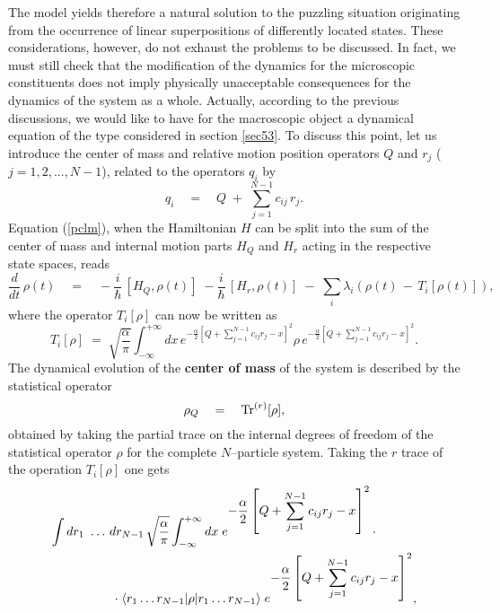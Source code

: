 \documentclass[12pt]{article}
\begin{document}
The model yields therefore a natural solution to the puzzling
situation originating from the occurrence of linear superpositions
of differently located states. These considerations, however, do
not exhaust the problems to be discussed. In fact, we must still
check that the modification of the dynamics for the microscopic
constituents does not imply physically unacceptable consequences
for the dynamics of the system as a whole. Actually, according to
the previous discussions, we would like to have for the
macroscopic object a dynamical equation of the type considered in
section \ref{sec53}. To discuss this point, let us introduce the
center  of mass and relative motion position operators $Q$ and
$r_{j}$ ($j=1,2,...,N-1$), related to the operators $q_{i}$ by
\begin{equation}
q_{i} \quad = \quad  Q \; + \; \sum_{j=1}^{N-1} c_{ij}\, r_{j}.
\end{equation}
Equation (\ref{pclm}), when the Hamiltonian $H$ can be split into
the sum of the center   of mass and internal motion parts $H_{Q}$
and $H_{r}$ acting in the respective state spaces, reads
\begin{equation} \label{pclm2}
\frac{d}{dt}\, \rho(t) \quad = \quad -\frac{i}{\hbar}\, [H_{Q},
\rho(t)] \; -\frac{i}{\hbar}\, [H_{r}, \rho(t)] \; - \; \sum_{i}
\lambda_{i} \left( \rho(t) \, - \, T_{i}[\rho(t)]\right),
\end{equation}
where the operator $T_{i}[\rho]$ can now be written as
\begin{equation}
T_{i}[\rho] \; = \; \sqrt{\frac{\alpha}{\pi}}
\int_{-\infty}^{+\infty} dx\, e^{\displaystyle -\frac{\alpha}{2}
\left[Q + \sum_{j=1}^{N-1} c_{ij} r_{j} - x \right]^{2}} \rho\,
 e^{\displaystyle -\frac{\alpha}{2}
\left[Q + \sum_{j=1}^{N-1} c_{ij} r_{j} - x \right]^{2}}.
\end{equation}
The dynamical evolution of the {\bf center of mass}  of the system
is described by the statistical operator
\begin{equation}
\rho_{Q} \quad = \quad \makebox{Tr}^{(r)}[\rho],
\end{equation}
obtained by taking the partial trace on the internal degrees of
freedom of the statistical operator $\rho$ for the complete
$N$--particle system. Taking the $r$ trace of the operation
$T_{i}[\rho]$ one gets
\begin{eqnarray}
\lefteqn{ \int dr_{1}\ \ldots \, dr_{N-1}\,
\sqrt{\frac{\alpha}{\pi}} \int_{-\infty}^{+\infty} dx \;
e^{\displaystyle -\frac{\alpha}{2} \left[Q + \sum_{j=1}^{N-1}
c_{ij} r_{j} - x \right]^{2}}\,
\cdot\qquad\qquad} \nonumber \\
& & \qquad\qquad \cdot\; \langle r_{1} \ldots r_{N-1}|\rho|r_{1}
\ldots r_{N-1}\rangle\; e^{\displaystyle -\frac{\alpha}{2} \left[Q
+ \sum_{j=1}^{N-1} c_{ij} r_{j} - x \right]^{2}},
\end{eqnarray}
\end{document}
